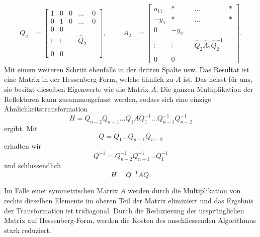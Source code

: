 \begin{align*}
	Q_{2}&=
	\begin{bmatrix}
	1 & 0 & 0 & ... & 0\\
	0 & 1 & 0 & ... & 0\\
	0 & 0 &\\
	\vdots & \vdots & &\hat{Q}_2 &\\
	 &  &\\
	0 & 0 &
	\end{bmatrix},
&&&
	A_{2}&=
	\begin{bmatrix}
	a_{11} & * &  & \dots & *\\
	-y_{1} & * &  & \dots & *\\
	0 & -y_{2} &\\
	\vdots & \vdots  & &\hat{Q}_2\hat{A}_{2}\hat{Q}_2^{-1} &\\
	 &  &\\
	0 & 0 &
	\end{bmatrix}.
\end{align*}
Mit einem weiteren Schritt ebenfalls in der dritten Spalte usw.
Das Resultat ist eine Matrix in der Hessenberg-Form, welche ähnlich zu $A$ ist.
Das heisst für uns, sie besitzt dieselben Eigenwerte wie die Matrix $A$.
Die ganzen Multiplikation der Reflektoren kann zusammengefasst werden, sodass sich eine einzige Ähnlichkeitstransformation
\begin{equation}
	H=Q_{n-2}Q_{n-1}...Q_{1}AQ_{1}^{-1}...Q_{n-1}^{-1}Q_{n-2}^{-1}
\end{equation}
ergibt.
Mit 
\begin{equation}
	Q=Q_{1}\dots Q_{n-1}Q_{n-2}
\end{equation}
erhalten wir
\begin{equation}
	Q^{-1} = Q_{n-2}^{-1}Q_{n-1}^{-1}\dots Q_{1}^{-1}
\end{equation}
und schlussendlich
\begin{equation}
H=Q^{-1}AQ.
\end{equation}

Im Falle einer symmetrischen Matrix $A$ werden durch die Multiplikation von rechts dieselben Elemente im oberen Teil der Matrix eliminiert und das Ergebnis der Transformation ist tridiagonal.
Durch die Reduzierung der ursprünglichen Matrix auf Hessenberg-Form, werden die Kosten des anschliessenden Algorithmus stark reduziert.
